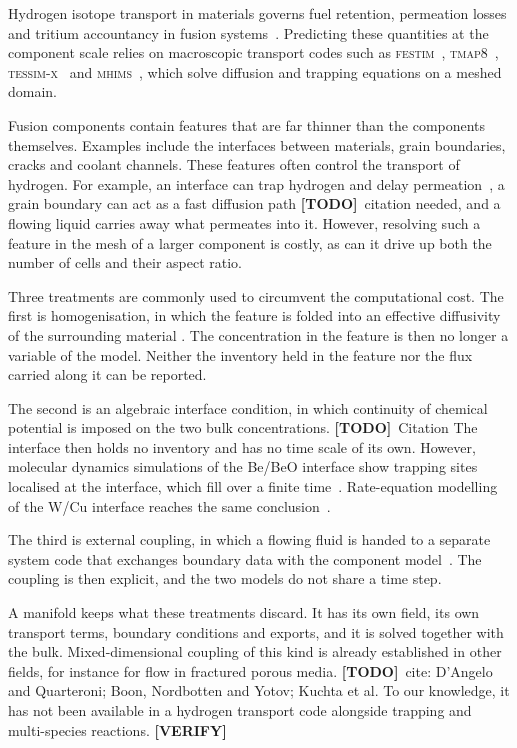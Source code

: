 \documentclass[5p]{elsarticle}
\newcommand{\FESTIM}{\textsc{festim}}
\newcommand{\TMAP}{\textsc{tmap}}
\newcommand{\MHIMS}{\textsc{mhims}}
\newcommand{\TODO}[1]{\textcolor{BrickRed}{\textbf{[TODO]}~#1}}
\newcommand{\VERIFY}[1]{\textcolor{RedOrange}{\textbf{[VERIFY]}~#1}}
\begin{document}
Hydrogen isotope transport in materials governs fuel retention, permeation losses and tritium accountancy in fusion systems~\cite{meschini_impact_2025, meschini_modeling_2023}.
Predicting these quantities at the component scale relies on macroscopic transport codes such as \FESTIM{}~\cite{dark_festim_2026}, \TMAP{}8~\cite{simon_moose-based_2025}, \textsc{tessim-x}~\cite{schmid_implications_2024} and \MHIMS{}~\cite{hodille_macroscopic_2015},
which solve diffusion and trapping equations on a meshed domain.

Fusion components contain features that are far thinner than the components themselves.
Examples include the interfaces between materials, grain boundaries, cracks and coolant channels.
These features often control the transport of hydrogen.
For example, an interface can trap hydrogen and delay permeation~\cite{hodille_molecular_2022, silva-solis_hydrogen_2026}, a grain boundary can act as a fast diffusion path \TODO{citation needed},  and a flowing liquid carries away what permeates into it.
However, resolving such a feature in the mesh of a larger component is costly, as can it drive up both the number of cells and their aspect ratio.

Three treatments are commonly used to circumvent the computational cost. The first is homogenisation, in which the feature is folded into an effective diffusivity of the surrounding material \cite{hart_diffusion_1957, harrison_diffusion_1961, oriani_diffusion_1970}.
The concentration in the feature is then no longer a variable of the model.
Neither the inventory held in the feature nor the flux carried along it can be reported.

The second is an algebraic interface condition, in which continuity of chemical potential is imposed on the two bulk concentrations. \TODO{Citation}
The interface then holds no inventory and has no time scale of its own.
However, molecular dynamics simulations of the Be/BeO interface show trapping sites localised at the interface, which fill over a finite time~\cite{hodille_molecular_2022}.
Rate-equation modelling of the W/Cu interface reaches the same conclusion~\cite{silva-solis_hydrogen_2026}.

The third is external coupling, in which a flowing fluid is handed to a separate system code that exchanges boundary data with the component model~\cite{meschini_modeling_2023}.
The coupling is then explicit, and the two models do not share a time step.

A manifold keeps what these treatments discard.
It has its own field, its own transport terms, boundary conditions and exports, and it is solved together with the bulk.
Mixed-dimensional coupling of this kind is already established in other fields, for instance for flow in fractured porous media. \TODO{cite: D'Angelo and Quarteroni; Boon, Nordbotten and Yotov; Kuchta et al.}
To our knowledge, it has not been available in a hydrogen transport code alongside trapping and multi-species reactions. \VERIFY{}
\end{document}
